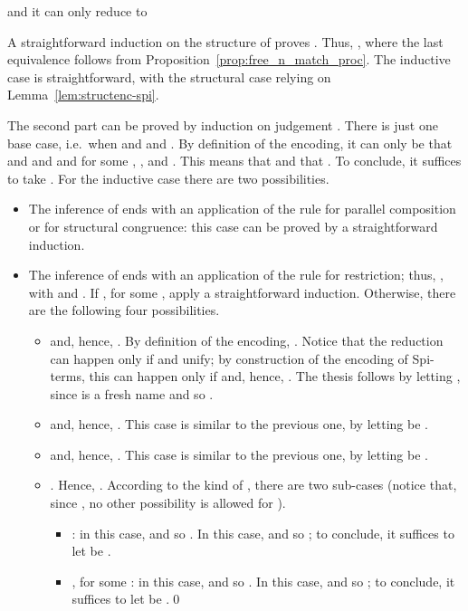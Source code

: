\documentclass{LMCS}
\begin{document}
and it can only reduce to

A straightforward induction on the structure of  proves
. Thus,
,
where the last equivalence follows from Proposition~\ref{prop:free_n_match_proc}.
The inductive case is straightforward, with the structural case relying on Lemma~\ref{lem:structenc-spi}.

The second part can be proved by induction on judgement .
There is just one base case, i.e.\ when  and
 and .
By definition of the encoding, it can only be that
 and  and
 and 
for some , ,  and . This means that 
and that .
To conclude, it suffices to take .
For the inductive case there are two possibilities.
\begin{itemize}
	\item The inference of  ends with an application of the rule for
				parallel composition or for structural congruence: this case can be proved by a
				straightforward induction.
	\item The inference of  ends with an application of the rule for restriction;
				thus, , with  and .
				If , for some , apply a straightforward induction.
				Otherwise, there are the following four possibilities.
				\begin{itemize}
					\item 
								and, hence, . By definition of the encoding, 
								. Notice that the reduction  can happen only if
								 and  unify; by construction of the encoding of Spi-terms,
								this can happen only if  and, hence, .
								The thesis follows by letting , since  is a fresh name and so
								.
					\item 
								and, hence, . 
								This case is similar to the previous one, by letting  be
								.
					\item 
								and, hence, .
								This case is similar to the previous one, by letting  be
								.
					\item .
								Hence, .
								According to the kind of , there are two sub-cases
								(notice that, since , no other possibility is allowed for ).
								\begin{itemize}
									\item : in this case, 
												and so .
												In this case,  and so ; to conclude,
												it suffices to let  be .
									\item , for some :
												in this case, 
												and so .
												In this case,  and so ; to conclude, 
												it suffices to let  be .\qed
								\end{itemize}
				\end{itemize}
\end{itemize}
\end{document}
